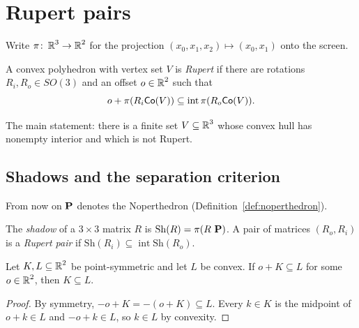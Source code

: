 \chapter{Rupert pairs}
\label{chap:prelims}

Write $\pi \colon \operatorname{\mathbb{R}}^3 \to \operatorname{\mathbb{R}}^2$ for the projection $(x_0, x_1, x_2) \mapsto (x_0, x_1)$
onto the screen.

\begin{definition}
\label{def:rupert}
\leanok
A convex polyhedron with vertex set $V$ is \emph{Rupert} if there are rotations
$R_i, R_o \in SO(3)$ and an offset $o \in \operatorname{\mathbb{R}}^2$ such that
\[
  o + \pi(R_i \mathsf{Co}(V)) \subseteq \operatorname{int} \pi(R_o \mathsf{Co}(V)).
\]
\end{definition}

\begin{definition}
\label{def:exists_non_rupert}
\leanok
{}
The main statement: there is a finite set $V \subseteq \operatorname{\mathbb{R}}^3$ whose convex hull has
nonempty interior and which is not Rupert.
\end{definition}

\section{Shadows and the separation criterion}

From now on $\operatorname{\mathbf{P}}$ denotes the Noperthedron (Definition~\ref{def:noperthedron}).

\begin{definition}
\label{def:shadow}
\leanok
{}
The \emph{shadow} of a $3 \times 3$ matrix $R$ is $\mathrm{Sh}(R) = \pi(R\,\operatorname{\mathbf{P}})$.
A pair of matrices $(R_o, R_i)$ is a \emph{Rupert pair} if
$\mathrm{Sh}(R_i) \subseteq \operatorname{int} \mathrm{Sh}(R_o)$.
\end{definition}

\begin{lemma}
\label{lem:common_center}
\leanok
{}
Let $K, L \subseteq \operatorname{\mathbb{R}}^2$ be point-symmetric and let $L$ be convex. If $o + K \subseteq L$
for some $o \in \operatorname{\mathbb{R}}^2$, then $K \subseteq L$.
\end{lemma}
\begin{proof}
\leanok
By symmetry, $-o + K = -(o + K) \subseteq L$. Every $k \in K$ is the midpoint of
$o + k \in L$ and $-o + k \in L$, so $k \in L$ by convexity.
\end{proof}

